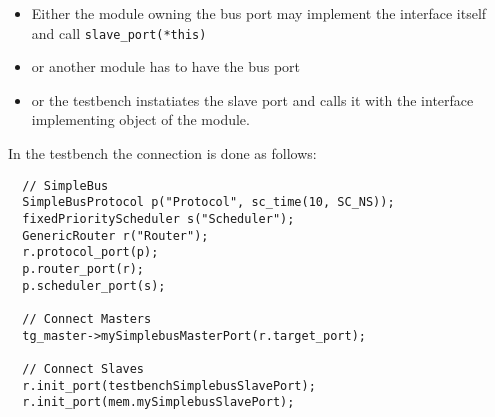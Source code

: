\begin{itemize}
  \item Either the module owning the bus port may implement the interface itself and call \mbox{\lstinline|slave_port(*this)|} 
  \item or another module has to have the bus port 
  \item or the testbench instatiates the slave port and calls it with the interface implementing object of the module.
\end{itemize}

In the testbench the connection is done as follows:
\begin{lstlisting}
  // SimpleBus
  SimpleBusProtocol p("Protocol", sc_time(10, SC_NS));
  fixedPriorityScheduler s("Scheduler");
  GenericRouter r("Router");
  r.protocol_port(p);
  p.router_port(r);
  p.scheduler_port(s);
  
  // Connect Masters
  tg_master->mySimplebusMasterPort(r.target_port);

  // Connect Slaves
  r.init_port(testbenchSimplebusSlavePort);
  r.init_port(mem.mySimplebusSlavePort);
\end{lstlisting}

